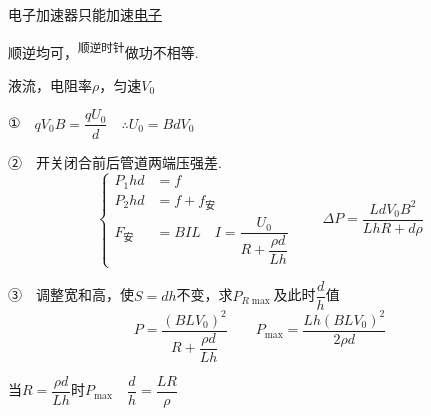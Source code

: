 \noindent 电子加速器只能加速\underline{电子}

\noindent 顺逆均可，\textsuperscript{顺逆时针}做功不相等.
\begin{problem}
\noindent 液流，电阻率$\rho$，匀速$V_0$

\noindent ①　$qV_0B=\dfrac{qU_0}{d}$　$\therefore U_0=BdV_0$

\noindent ②　开关闭合前后管道两端压强差.
\[ \left\{\begin{aligned}
P_1hd&=f\\
P_2hd&=f+f_{\text{安}}\\
F_{\text{安}}&=BIL\quad I=\dfrac{U_0}{R+\dfrac{\rho d}{Lh}}
\end{aligned}\right.\qquad \Delta P=\dfrac{LdV_0B^2}{LhR+d\rho} \]%

\noindent ③　调整宽和高，使$S=dh$不变，求$P_{R\max}$及此时$\dfrac{d}{h}$值
\[ P=\dfrac{(BLV_0)^2}{R+\dfrac{\rho d}{Lh}}\qquad P_{\max}=\dfrac{Lh(BLV_0)^2}{2\rho d} \]%

\noindent 当$R=\dfrac{\rho d}{Lh}$时$P_{\max}$　$\dfrac{d}{h}=\dfrac{LR}{\rho}$
\end{problem}
